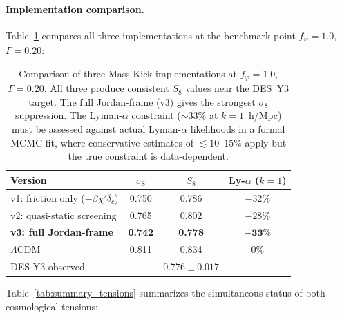 \documentclass[a4paper,11pt]{article}
\newcommand{\LCDM}{$\Lambda$CDM}
\newcommand{\chif}{\chi}
\newcommand{\fphi}{f_\varphi}
\begin{document}
\paragraph{Implementation comparison.} Table~\ref{tab:versions} compares all three implementations at the benchmark point $\fphi = 1.0$, $\Gamma = 0.20$:

\begin{table}[h!]
\centering
\begin{tabular}{lccc}
\toprule
\textbf{Version} & $\sigma_8$ & $S_8$ & Ly-$\alpha$ ($k\!=\!1$) \\
\midrule
v1: friction only ($-\beta\chif'\delta_c$) & 0.750 & 0.786 & $-32\%$ \\
v2: quasi-static screening & 0.765 & 0.802 & $-28\%$ \\
\textbf{v3: full Jordan-frame} & \textbf{0.742} & \textbf{0.778} & $\mathbf{-33\%}$ \\
\midrule
\LCDM & 0.811 & 0.834 & 0\% \\
DES Y3 observed & --- & $0.776 \pm 0.017$ & --- \\
\bottomrule
\end{tabular}
\caption{Comparison of three Mass-Kick implementations at $\fphi = 1.0$, $\Gamma = 0.20$. All three produce consistent $S_8$ values near the DES~Y3 target. The full Jordan-frame (v3) gives the strongest $\sigma_8$ suppression. The Lyman-$\alpha$ constraint ($\sim$33\% at $k = 1$~h/Mpc) must be assessed against actual Lyman-$\alpha$ likelihoods in a formal MCMC fit, where conservative estimates of $\lesssim 10$--$15\%$ apply but the true constraint is data-dependent.}
\label{tab:versions}
\end{table}

Table~\ref{tab:summary_tensions} summarizes the simultaneous status of both cosmological tensions:
\end{document}
